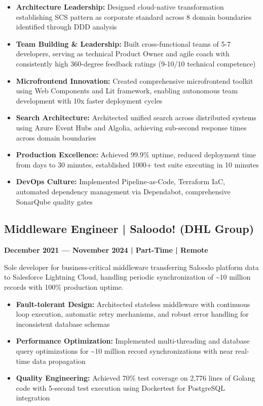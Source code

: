 \documentclass[11pt,a4paper]{article}
\begin{document}
\begin{itemize}
\item \textbf{Architecture Leadership:} Designed cloud-native transformation establishing SCS pattern as corporate standard across 8 domain boundaries identified through DDD analysis
\item \textbf{Team Building \& Leadership:} Built cross-functional teams of 5-7 developers, serving as technical Product Owner and agile coach with consistently high 360-degree feedback ratings (9-10/10 technical competence)
\item \textbf{Microfrontend Innovation:} Created comprehensive microfrontend toolkit using Web Components and Lit framework, enabling autonomous team development with 10x faster deployment cycles
\item \textbf{Search Architecture:} Architected unified search across distributed systems using Azure Event Hubs and Algolia, achieving sub-second response times across domain boundaries
\item \textbf{Production Excellence:} Achieved 99.9\% uptime, reduced deployment time from days to 30 minutes, established 1000+ test suite executing in 10 minutes
\item \textbf{DevOps Culture:} Implemented Pipeline-as-Code, Terraform IaC, automated dependency management via Dependabot, comprehensive SonarQube quality gates
\end{itemize}

\subsection{Middleware Engineer | Saloodo! (DHL Group)}
\textbf{December 2021 --- November 2024 | Part-Time | Remote}

Sole developer for business-critical middleware transferring Saloodo platform data to Salesforce Lightning Cloud, handling periodic synchronization of \textasciitilde{}10 million records with 100\% production uptime.

\begin{itemize}
\item \textbf{Fault-tolerant Design:} Architected stateless middleware with continuous loop execution, automatic retry mechanisms, and robust error handling for inconsistent database schemas
\item \textbf{Performance Optimization:} Implemented multi-threading and database query optimizations for \textasciitilde{}10 million record synchronizations with near real-time data propagation
\item \textbf{Quality Engineering:} Achieved 70\% test coverage on 2,776 lines of Golang code with 5-second test execution using Dockertest for PostgreSQL integration
\end{itemize}
\end{document}
